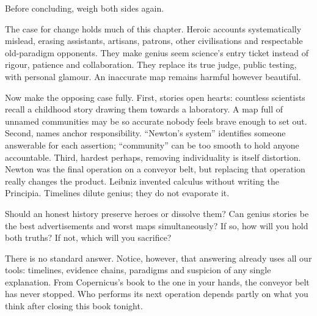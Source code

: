 Before concluding, weigh both sides again.

The case for change holds much of this chapter. Heroic accounts systematically mislead, erasing assistants, artisans, patrons, other civilisations and respectable old-paradigm opponents. They make genius seem science's entry ticket instead of rigour, patience and collaboration. They replace its true judge, public testing, with personal glamour. An inaccurate map remains harmful however beautiful.

Now make the opposing case fully. First, stories open hearts: countless scientists recall a childhood story drawing them towards a laboratory. A map full of unnamed communities may be so accurate nobody feels brave enough to set out. Second, names anchor responsibility. ``Newton's system'' identifies someone answerable for each assertion; ``community'' can be too smooth to hold anyone accountable. Third, hardest perhaps, removing individuality is itself distortion. Newton was the final operation on a conveyor belt, but replacing that operation really changes the product. Leibniz invented calculus without writing the Principia. Timelines dilute genius; they do not evaporate it.

Should an honest history preserve heroes or dissolve them? Can genius stories be the best advertisements and worst maps simultaneously? If so, how will you hold both truths? If not, which will you sacrifice?

There is no standard answer. Notice, however, that answering already uses all our tools: timelines, evidence chains, paradigms and suspicion of any single explanation. From Copernicus's book to the one in your hands, the conveyor belt has never stopped. Who performs its next operation depends partly on what you think after closing this book tonight.

